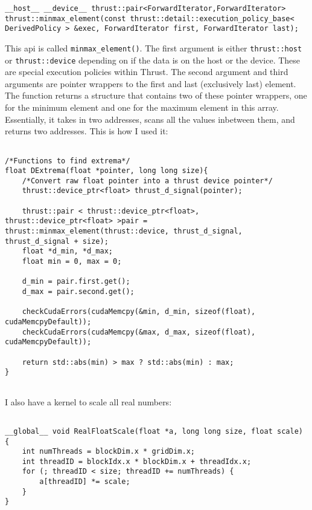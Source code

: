 \begin{verbatim}
__host__ __device__ thrust::pair<ForwardIterator,ForwardIterator> thrust::minmax_element(const thrust::detail::execution_policy_base< DerivedPolicy > &exec, ForwardIterator first, ForwardIterator last);
\end{verbatim}

This \gls{api} is called \verb|minmax_element()|. The first argument is either \verb|thrust::host| or \verb|thrust::device| depending on if the data is on the host or the device. These are special execution policies within Thrust. The second argument and third arguments are pointer wrappers to the first and last (exclusively last) element. The function returns a structure that contains two of these pointer wrappers, one for the minimum element and one for the maximum element in this array. Essentially, it takes in two addresses, scans all the values inbetween them, and returns two addresses. This is how I used it:
\begin{verbatim}

/*Functions to find extrema*/
float DExtrema(float *pointer, long long size){
	/*Convert raw float pointer into a thrust device pointer*/
	thrust::device_ptr<float> thrust_d_signal(pointer);
	
	thrust::pair < thrust::device_ptr<float>, thrust::device_ptr<float> >pair = thrust::minmax_element(thrust::device, thrust_d_signal, thrust_d_signal + size);
	float *d_min, *d_max;
	float min = 0, max = 0;
	
	d_min = pair.first.get();
	d_max = pair.second.get();
	
	checkCudaErrors(cudaMemcpy(&min, d_min, sizeof(float), cudaMemcpyDefault));
	checkCudaErrors(cudaMemcpy(&max, d_max, sizeof(float), cudaMemcpyDefault));

	return std::abs(min) > max ? std::abs(min) : max;
}


\end{verbatim}

I also have a kernel to scale all real numbers:

\begin{verbatim}

__global__ void RealFloatScale(float *a, long long size, float scale) {
	int numThreads = blockDim.x * gridDim.x;
	int threadID = blockIdx.x * blockDim.x + threadIdx.x;
	for (; threadID < size; threadID += numThreads) {
		a[threadID] *= scale;
	}
}
\end{verbatim}

